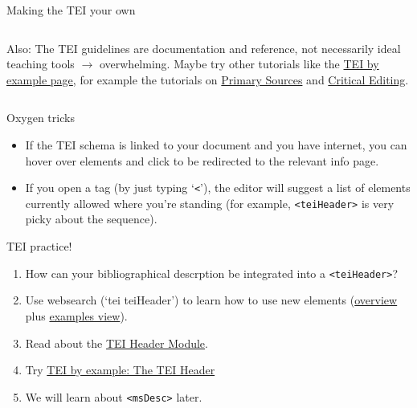 \begin{frame}[allowframebreaks]{Making the TEI your own}
\begin{columns}
\begin{block}{}
\footnotesize
Also: The TEI guidelines are documentation and reference, not necessarily ideal teaching tools $\to$ overwhelming. Maybe try other tutorials like the \href{https://teibyexample.org/tutorials/TBED00v00.htm}{TEI by example page}, for example the tutorials on \alert{\href{https://teibyexample.org/tutorials/TBED06v00.htm}{Primary Sources}} and \alert{\href{https://teibyexample.org/tutorials/TBED07v00.htm}{Critical Editing}}.
\end{block}

\end{columns}

\framebreak

\begin{block}{Oxygen tricks}
\begin{itemize}\footnotesize
    \item If the TEI schema is linked to your document and you have internet, you can hover over elements and click to be redirected to the relevant info page. 
    \item If you open a tag (by just typing `\texttt{<}'), the editor will suggest a list of elements currently allowed where you're standing (for example, \texttt{<teiHeader>} is very picky about the sequence).
\end{itemize}
\end{block}

\end{frame}


\begin{frame}[standout]
    \alert{TEI practice!} \\
    \begin{enumerate}\small
        \item How can your bibliographical descrption be integrated into a \texttt{<teiHeader>}?
        \item Use websearch (`tei teiHeader') to learn how to use new elements (\href{https://www.tei-c.org/release/doc/tei-p5-doc/en/html/ref-teiHeader.html}{overview} plus \href{https://www.tei-c.org/release/doc/tei-p5-doc/en/html/examples-teiHeader.html}{examples view}).
        \item Read about the \href{https://www.tei-c.org/release/doc/tei-p5-doc/en/html/HD.html}{TEI Header Module}.
        \item Try \href{https://teibyexample.org/tutorials/TBED02v00.htm}{TEI by example: The TEI Header}
        \item We will learn about \texttt{<msDesc>} later.
    \end{enumerate} 
\end{frame}


